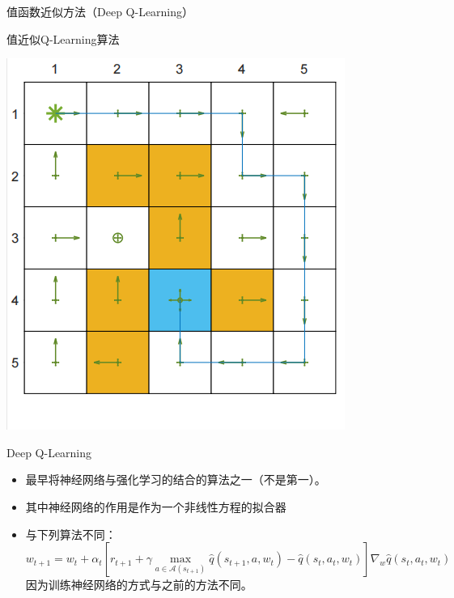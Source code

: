 \begin{section}{值函数近似方法\alert{（Deep Q-Learning）}}
\begin{frame}{值近似Q-Learning算法}
\begin{center}
\begin{minipage}{0.3\textwidth}
            \includegraphics[width=\linewidth]{assets/valueqlearningpolicy.png}
        \end{minipage}
    \end{center}
    
\end{frame}

\begin{frame}{Deep Q-Learning}
    \begin{itemize}
        \item 最早将神经网络与强化学习的结合的算法之一（不是第一）。
        \item 其中神经网络的作用是作为一个非线性方程的拟合器
        \item 与下列算法不同：
        \[
            w_{t+1}=w_t+\alpha_t\left[r_{t+1}+\gamma \underset{a\in \mathcal{A}(s_{t+1})}{\max}\hat{q}(s_{t+1},a,w_t)-\hat{q}(s_t,a_t,w_t)\right]\nabla_w\hat{q}(s_t,a_t,w_t)
        \]
        因为训练神经网络的方式与之前的方法不同。
    \end{itemize}
\end{frame}


\end{section}
